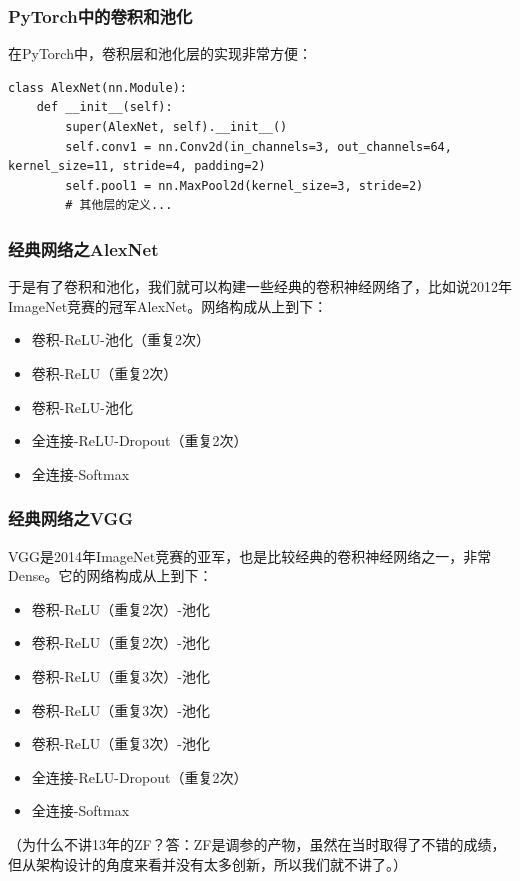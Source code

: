 \documentclass[fontset=none]{ctexbeamer}
\begin{document}
\begin{frame}[fragile]
    \frametitle{PyTorch中的卷积和池化}

在PyTorch中，卷积层和池化层的实现非常方便：
\begin{verbatim}
class AlexNet(nn.Module):
    def __init__(self):
        super(AlexNet, self).__init__()
        self.conv1 = nn.Conv2d(in_channels=3, out_channels=64, kernel_size=11, stride=4, padding=2)
        self.pool1 = nn.MaxPool2d(kernel_size=3, stride=2)
        # 其他层的定义...
\end{verbatim}

\end{frame}

\begin{frame}
    \frametitle{经典网络之AlexNet}

    于是有了卷积和池化，我们就可以构建一些经典的卷积神经网络了，比如说2012年ImageNet竞赛的冠军AlexNet。网络构成从上到下：
\begin{itemize}
    \item 卷积-ReLU-池化（重复2次）
    \item 卷积-ReLU（重复2次）
    \item 卷积-ReLU-池化
    \item 全连接-ReLU-Dropout（重复2次）
    \item 全连接-Softmax
\end{itemize}

\end{frame}

\begin{frame}
    \frametitle{经典网络之VGG}

    VGG是2014年ImageNet竞赛的亚军，也是比较经典的卷积神经网络之一，非常Dense。它的网络构成从上到下：
\begin{itemize}
    \item 卷积-ReLU（重复2次）-池化
    \item 卷积-ReLU（重复2次）-池化
    \item 卷积-ReLU（重复3次）-池化
    \item 卷积-ReLU（重复3次）-池化
    \item 卷积-ReLU（重复3次）-池化
    \item 全连接-ReLU-Dropout（重复2次）
    \item 全连接-Softmax
\end{itemize}

（为什么不讲13年的ZF？答：ZF是调参的产物，虽然在当时取得了不错的成绩，但从架构设计的角度来看并没有太多创新，所以我们就不讲了。）

\end{frame}
\end{document}
